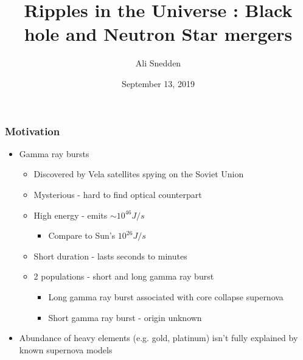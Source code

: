 \documentclass{beamer}
\title{Ripples in the Universe : Black hole and Neutron Star mergers}
\author{Ali Snedden
}
\date{September 13, 2019}
\begin{document}
\begin{frame}
\titlepage
\end{frame}






%
%
\begin{frame}
\frametitle{Motivation}
\begin{itemize}
    \item Gamma ray bursts
    \pause
    \begin{itemize}
        \item Discovered by Vela satellites spying on the Soviet Union
        \pause
        \item Mysterious - hard to find optical counterpart
        \pause
        \item High energy - emits $\sim 10^{46}J/s$ 
        \pause
        \begin{itemize}
            \item Compare to Sun's $10^{26}J/s$
        \end{itemize}
        \pause
        \item Short duration - lasts seconds to minutes
        \pause
        \item 2 populations - short and long gamma ray burst
        \begin{itemize}
            \pause
            \item Long gamma ray burst associated with core collapse supernova
            \pause
            \item Short gamma ray burst - origin unknown
        \end{itemize}
    \end{itemize}
    \pause
    \item Abundance of heavy elements (e.g. gold, platinum) isn't fully explained by known supernova models
\end{itemize}
\end{frame}
\end{document}
